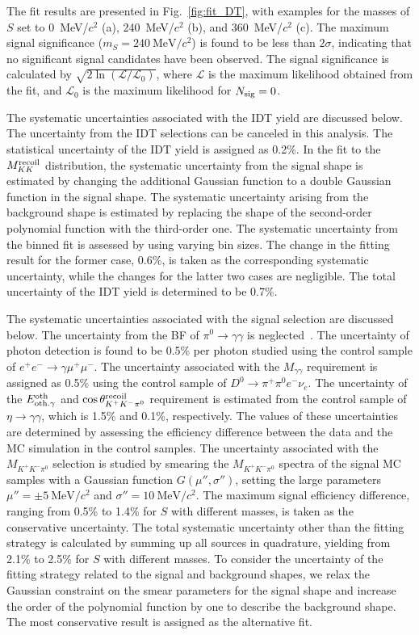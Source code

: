 \documentclass[
 reprint,
 amsmath,amssymb,a
 aps,
 twocolumn
]{revtex4-2}
\def \mevcc{~\mbox{MeV/$c^2$}}
\begin{document}
The fit results are presented in Fig.~\ref{fig:fit_DT}, with examples for the masses of $S$ set to 0~MeV/$c^2$ (a), 240~MeV/$c^2$ (b), and 360~MeV/$c^2$ (c). The maximum signal significance ($m_S=240\mevcc$) is found to be less than $2\sigma$, indicating that no significant signal candidates have been observed.
The signal significance is calculated by $\sqrt{2\ln(\mathcal{L}/\mathcal{L}_0)}$, where $\mathcal{L}$ is the maximum likelihood obtained from the fit, and $\mathcal{L}_0$ is the maximum likelihood for $N_{\rm{sig}}=0$.

The systematic uncertainties associated with the IDT yield are discussed below. The uncertainty from the IDT selections can be canceled in this analysis.
The statistical uncertainty of the IDT yield is assigned as 0.2\%.
In the fit to the $M^{\rm{recoil}}_{KK}$ distribution, the systematic uncertainty from the signal shape is estimated by changing the additional Gaussian function to a double Gaussian function in the signal shape.
The systematic uncertainty arising from the background shape is estimated by replacing the shape of the second-order polynomial function with the third-order one.
The systematic uncertainty from the binned fit is assessed by using varying bin sizes. The change in the fitting result for the former case, 0.6\%, is taken as the corresponding systematic uncertainty, while the changes for the latter two cases are negligible.
The total uncertainty of the IDT yield is determined to be 0.7\%.

The systematic uncertainties associated with the signal selection are discussed below.
The uncertainty from the BF of $\pi^0\to\gamma\gamma$ is neglected~\cite{pdg:2024}.
The uncertainty of photon detection is found to be 0.5\% per photon studied using the control sample of $e^+e^-\to\gamma\mu^+\mu^-$. The uncertainty associated with the $M_{\gamma\gamma}$ requirement is assigned as 0.5\% using the control sample of $D^0\to\pi^+\pi^0e^-\nu_e$.
The uncertainty of the $E^{\rm{oth}}_{\rm{oth.\gamma}}$ and $\cos\theta^{\rm{recoil}}_{K^+K^-\pi^0}$ requirement is estimated from the control sample of $\eta\to\gamma\gamma$, which is 1.5\% and 0.1\%, respectively.
The values of these uncertainties are determined by assessing the efficiency difference between the data and the MC simulation in the control samples.
The uncertainty associated with the $M_{K^+K^-\pi^0}$ selection is studied by smearing the $M_{K^+K^-\pi^0}$ spectra of the signal MC samples with a Gaussian function $G(\mu'',\sigma'')$, setting the large parameters $\mu''=\pm5\mevcc$ and $\sigma''=10\mevcc$. The maximum signal efficiency difference, ranging from 0.5\% to 1.4\% for $S$ with different masses, is taken as the conservative uncertainty.
The total systematic uncertainty other than the fitting strategy is calculated by summing up all sources in quadrature, yielding from 2.1\% to 2.5\% for $S$ with different masses.
To consider the uncertainty of the fitting strategy related to the signal and background shapes, we relax the Gaussian constraint on the smear parameters for the signal shape and increase the order of the polynomial function by one to describe the background shape. The most conservative result is assigned as the alternative fit.
\end{document}
